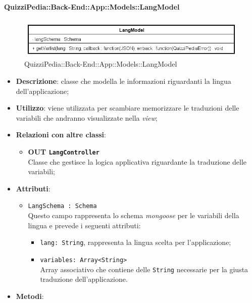 \paragraph{QuizziPedia::Back-End::App::Models::LangModel}
\label{QuizziPedia::Back-End::App::Models::LangModel}
\begin{figure}[ht]
	\centering
	\includegraphics[scale=0.8]{UML/Classi/Back-End/QuizziPedia_Back-End_App_Models_langModel.png}
	\caption{QuizziPedia::Back-End::App::Models::LangModel}
\end{figure}
\FloatBarrier
	\begin{itemize}
		\item \textbf{Descrizione}: classe che modella le informazioni riguardanti la lingua dell'applicazione;
		\item \textbf{Utilizzo}: viene utilizzata per scambiare memorizzare le traduzioni delle variabili che andranno visualizzate nella \textit{view};
		\item \textbf{Relazioni con altre classi}:
			\begin{itemize}
				\item \textbf{OUT \texttt{LangController}} \\
				Classe che gestisce la logica applicativa riguardante la traduzione delle variabili;
			\end{itemize}
		\item \textbf{Attributi}:
			\begin{itemize}
				\item \texttt{LangSchema : Schema} \\
				Questo campo rappresenta lo schema \textit{mongoose} per le variabili della lingua e prevede i seguenti attributi:
					\begin{itemize}
						\item \texttt{lang: String}, rappresenta la lingua scelta per l'applicazione;
						\item \texttt{variables: Array<String>}\\ Array associativo che contiene delle \texttt{String} necessarie per la giusta traduzione dell'applicazione.
					\end{itemize}
			\end{itemize}
		\item \textbf{Metodi}:

\end{itemize}
